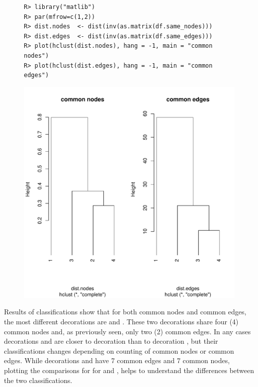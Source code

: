 \documentclass[article]{jss}\usepackage{knitr}
\begin{document}
\begin{figure}[H]
\begin{kframe}
\begin{verbatim}
R> library("matlib")
R> par(mfrow=c(1,2))
R> dist.nodes  <- dist(inv(as.matrix(df.same_nodes)))
R> dist.edges  <- dist(inv(as.matrix(df.same_edges)))
R> plot(hclust(dist.nodes), hang = -1, main = "common nodes")
R> plot(hclust(dist.edges), hang = -1, main = "common edges")
\end{verbatim}
\end{kframe}
\includegraphics[width=\maxwidth]{figure/unnamed-chunk-16-1} 

\end{figure}

Results of classifications show that for both common nodes and common edges, the most different decorations are  and . These two decorations share four (4) common nodes and, as previously seen, only two (2) common edges.
In any cases decorations  and  are closer to decoration  than to decoration , but their classifications changes depending on counting of common nodes or common edges. While decorations  and  have 7 common edges and 7 common nodes, plotting the comparisons for for  and , helps to understand the differences between the two classifications.
\end{document}
